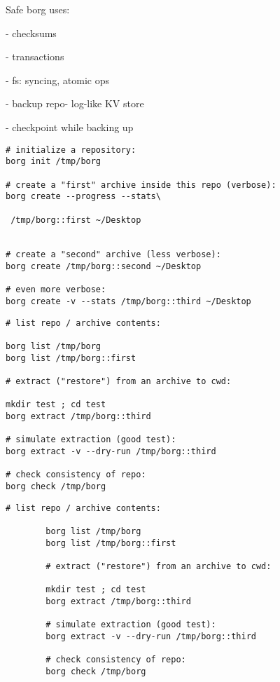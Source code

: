 \documentclass{beamer}
\begin{document}
\begin{frame}{Safe} 
	borg uses:
	
	- checksums
	
	- transactions
	
	- fs: syncing, atomic ops
	
	- backup repo- log-like KV store
	
	- checkpoint while backing up
	
\end{frame}

\begin{frame}[fragile]
	\begin{lstlisting}[backgroundcolor = \color{black},
		basicstyle=\color{lightgray}
			language = bash,
			framexleftmargin = 1em]
# initialize a repository:
borg init /tmp/borg

# create a "first" archive inside this repo (verbose): 
borg create --progress --stats\

 /tmp/borg::first ~/Desktop


# create a "second" archive (less verbose):
borg create /tmp/borg::second ~/Desktop

# even more verbose:
borg create -v --stats /tmp/borg::third ~/Desktop
\end{lstlisting}
\end{frame}

\begin{frame}[fragile]
	\begin{lstlisting}[backgroundcolor = \color{black},
		basicstyle=\color{lightgray}
		language = bash,
		framexleftmargin = 1em]
# list repo / archive contents:

borg list /tmp/borg
borg list /tmp/borg::first

# extract ("restore") from an archive to cwd:

mkdir test ; cd test
borg extract /tmp/borg::third

# simulate extraction (good test):
borg extract -v --dry-run /tmp/borg::third

# check consistency of repo:
borg check /tmp/borg
\end{lstlisting}
\end{frame}



\begin{frame}[fragile]
	\begin{lstlisting}[backgroundcolor = \color{black},
		basicstyle=\color{lightgray}
		language = bash,
		framexleftmargin = 1em]
		# list repo / archive contents:
		
		borg list /tmp/borg
		borg list /tmp/borg::first
		
		# extract ("restore") from an archive to cwd:
		
		mkdir test ; cd test
		borg extract /tmp/borg::third
		
		# simulate extraction (good test):
		borg extract -v --dry-run /tmp/borg::third
		
		# check consistency of repo:
		borg check /tmp/borg
	\end{lstlisting}
\end{frame}
\end{document}
